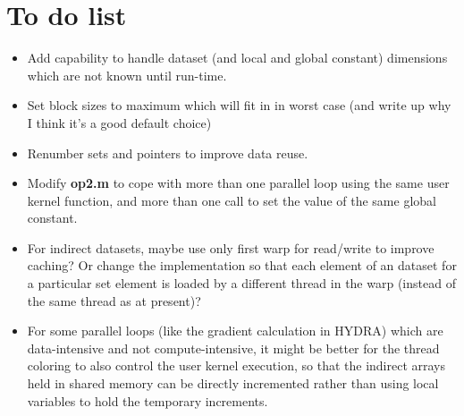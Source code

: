 \documentclass[12pt]{article}
\begin{document}
\newpage

\section{To do list}

\begin{itemize}
\item
Add capability to handle dataset (and local and global constant) dimensions 
which are not known until run-time.

\item
Set block sizes to maximum which will fit in in worst case
(and write up why I think it's a good default choice)

\item
Renumber sets and pointers to improve data reuse.

\item
Modify {\bf op2.m} to cope with more than one parallel loop using 
the same user kernel function, and more than one call to set the 
value of the same global constant.

\item
For indirect datasets, maybe use only first warp for read/write to 
improve caching?  Or change the implementation so that each element 
of an dataset for a particular set element is loaded by a different 
thread in the warp (instead of the same thread as at present)?

%

\item
For some parallel loops (like the gradient calculation in HYDRA)
which are data-intensive and not compute-intensive, it might be better 
for the thread coloring to also control the user kernel execution, so 
that the indirect arrays held in shared memory can be directly incremented 
rather than using local variables to hold the temporary increments.

\end{itemize}
\end{document}
